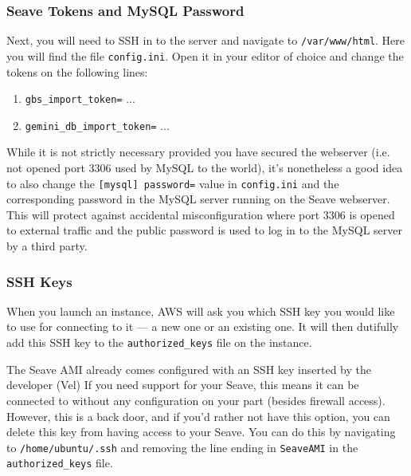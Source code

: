 \documentclass[11pt, a4paper]{article}
\begin{document}
\subsubsection{Seave Tokens and MySQL Password}

Next, you will need to SSH in to the server and navigate to \texttt{/var/www/html}. Here you will find the file \texttt{config.ini}. Open it in your editor of choice and change the tokens on the following lines:
\begin{enumerate}
	\item \texttt{gbs\_import\_token=} ...
	\item \texttt{gemini\_db\_import\_token=} ...
\end{enumerate}

While it is not strictly necessary provided you have secured the webserver (i.e. not opened port 3306 used by MySQL to the world), it's nonetheless a good idea to also change the \texttt{[mysql] password=} value in \texttt{config.ini} and the corresponding password in the MySQL server running on the Seave webserver. This will protect against accidental misconfiguration where port 3306 is opened to external traffic and the public password is used to log in to the MySQL server by a third party.

\subsubsection{SSH Keys}

When you launch an instance, AWS will ask you which SSH key you would like to use for connecting to it --- a new one or an existing one. It will then dutifully add this SSH key to the \texttt{authorized\_keys} file on the instance.

The Seave AMI already comes configured with an SSH key inserted by the developer (Vel) If you need support for your Seave, this means it can be connected to without any configuration on your part (besides firewall access). However, this is a back door, and if you'd rather not have this option, you can delete this key from having access to your Seave. You can do this by navigating to \texttt{/home/ubuntu/.ssh} and removing the line ending in \texttt{SeaveAMI} in the \texttt{authorized\_keys} file.

\end{document}
